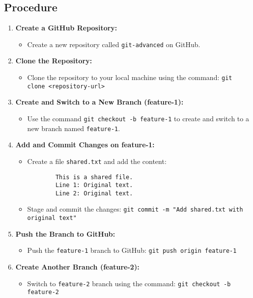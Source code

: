 \documentclass[a4paper,12pt]{article}
\begin{document}
\subsection*{Procedure}
\begin{enumerate}[label=\arabic*.]
    \item \textbf{Create a GitHub Repository:}
    \begin{itemize}
        \item Create a new repository called \texttt{git-advanced} on GitHub.
    \end{itemize}
    
    \item \textbf{Clone the Repository:}
    \begin{itemize}
        \item Clone the repository to your local machine using the command: \texttt{git clone <repository-url>}
    \end{itemize}
    
    \item \textbf{Create and Switch to a New Branch (feature-1):}
    \begin{itemize}
        \item Use the command \texttt{git checkout -b feature-1} to create and switch to a new branch named \texttt{feature-1}.
    \end{itemize}
    
    \item \textbf{Add and Commit Changes on feature-1:}
    \begin{itemize}
        \item Create a file \texttt{shared.txt} and add the content:
        \begin{verbatim}
        This is a shared file.
        Line 1: Original text.
        Line 2: Original text.
        \end{verbatim}
        \item Stage and commit the changes: \texttt{git commit -m "Add shared.txt with original text"}
    \end{itemize}
    
    \item \textbf{Push the Branch to GitHub:} 
    \begin{itemize}
        \item Push the \texttt{feature-1} branch to GitHub: \texttt{git push origin feature-1}
    \end{itemize}

    \item \textbf{Create Another Branch (feature-2):}
    \begin{itemize}
        \item Switch to \texttt{feature-2} branch using the command: \texttt{git checkout -b feature-2}
    \end{itemize}


\end{enumerate}
\end{document}
